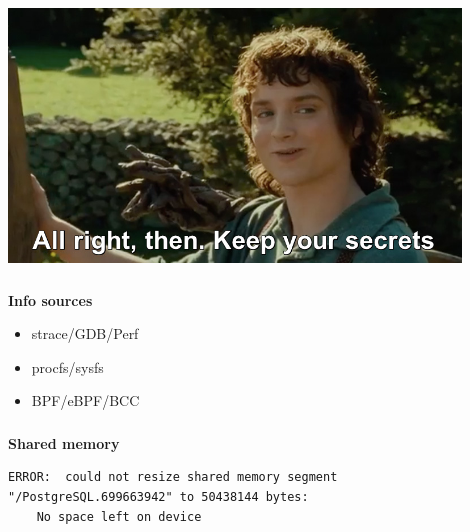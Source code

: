 \documentclass[usenames,dvipsnames, 18pt, compress, aspectratio=169]{beamer}
\begin{document}
\begin{frame}
    \frametitle{}
    \begin{center}

    \includegraphics[width=0.9\textwidth,center]{keep_your_secrets.jpg}

    \end{center}
\end{frame}

\begin{frame}
    \frametitle{}
    \begin{center}
    \textbf{Info sources}

        \begin{itemize}[]
            \item strace/GDB/Perf
            \item procfs/sysfs
            \item BPF/eBPF/BCC
        \end{itemize}

    \end{center}
\end{frame}

\begin{frame}[fragile]{}
    \frametitle{}
    \begin{center}
    \textbf{Shared memory}

        \begin{verbatim}
ERROR:  could not resize shared memory segment
"/PostgreSQL.699663942" to 50438144 bytes:
    No space left on device
        \end{verbatim}

    \end{center}
\end{frame}
\end{document}
